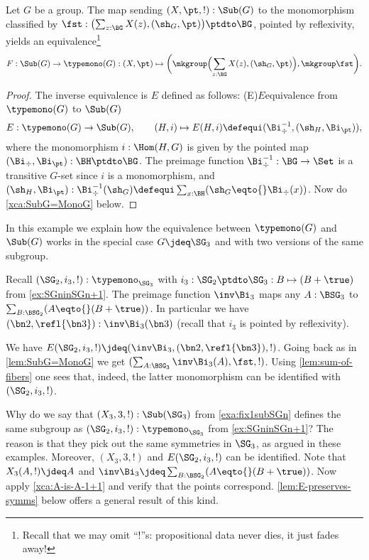 \begin{lemma}\label{lem:SubG=MonoG}
  Let $G$ be a group.
  The map sending $(X,\pt,!) : \Sub(G)$ to the monomorphism classified by
  $\fst: \bigl(\sum_{z:\BG}X(z),(\sh_G,\pt)\bigr)\ptdto\BG$, pointed by
  reflexivity, yields an equivalence\footnote{%
    Recall that we may omit ``!''s: propositional data never dies,
    it just fades away!}
  \[
    F: \Sub(G)\to \typemono(G) : (X,\pt) \mapsto
    \biggl(\mkgroup \Bigl(\sum_{z:\BG}X(z),(\sh_G,\pt)\Bigr),\mkgroup\fst\biggr).\qedhere
  \]
\end{lemma}

\begin{proof}
  The inverse equivalence is $E$ defined as follows:%
  \glossary(E){$E$}{equivalence from $\protect\typemono(G)$ to $\protect\Sub(G)$}
  \[
    E:\typemono(G)\to\Sub(G),\qquad
    (H,i)\mapsto E(H,i)\defequi (\Bi_\div^{-1},(\sh_H,\Bi_\pt)),
  \]
  where the monomorphism $i:\Hom(H,G)$ is given by
  the pointed map $(\Bi_\div,\Bi_\pt):\BH\ptdto\BG$.
  The preimage function $\Bi_\div^{-1}:\BG\to\Set$ is a transitive $G$-set 
  since $i$ is a monomorphism, and $(\sh_H,\Bi_\pt):\Bi_\div^{-1}(\sh_G)
  \defequi \sum_{x:\BH}(\sh_G\eqto{}\Bi_\div(x))$.
  Now do \cref{xca:SubG=MonoG} below.
\end{proof}

 \begin{example}\label{exa:EforSG3}
  In this example we explain how the equivalence between
  $\typemono(G)$ and $\Sub(G)$ works in the special case
  $G\jdeq\SG_3$ and with two versions of the same subgroup.
  
  Recall $(\SG_2,i_3,!):\typemono_{\SG_3}$ with
  $i_3: \SG_2\ptdto\SG_3 : B\mapsto (B+\true)$ from \cref{ex:SGninSGn+1}.
  The preimage function $\inv\Bi_3$ maps any $A:\BSG_3$
  to $\sum_{B:\BSG_2}(A\eqto{}(B+\true))$.
  In particular we have $(\bn2,\refl{\bn3}):\inv\Bi_3(\bn3)$
  (recall that $i_3$ is pointed by reflexivity).
   
  We have $E(\SG_2,i_3,!)\jdeq(\inv\Bi_3,(\bn2,\refl{\bn3}),!)$.
  Going back as in \cref{lem:SubG=MonoG} we get 
  $(\sum_{A:\BSG_3}\inv\Bi_3(A),\fst,!)$. Using \cref{lem:sum-of-fibers}
  one sees that, indeed, the latter monomorphism 
  can be identified with $(\SG_2,i_3,!)$.
  
  Why do we say that $(X_3,3,!):\Sub(\SG_3)$ from \cref{exa:fix1subSGn}
  defines the same subgroup as $(\SG_2,i_3,!):\typemono_{\SG_3}$
  from \cref{ex:SGninSGn+1}? The reason is that they pick out
  the same symmetries in $\SG_3$, as argued in these examples.
  Moreover, $(X_3,3,!)$ and $E(\SG_2,i_3,!)$ can be identified.
  Note that $X_3(A,!) \jdeq A$ and 
  $\inv\Bi_3 \jdeq \sum_{B:\BSG_2}(A\eqto{}(B+\true))$.
  Now apply \cref{xca:A-is-A-1+1} and verify that the points correspond.
  \cref{lem:E-preserves-symms} below offers a general result of this kind.
  \end{example}


